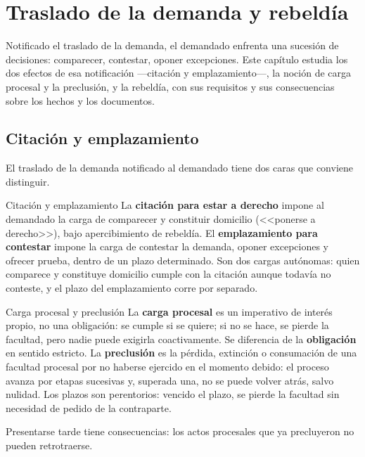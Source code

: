 \documentclass[12pt,oneside]{book}
\begin{document}
\chapter{Traslado de la demanda y rebeldía}\label{cap:traslado}

Notificado el traslado de la demanda, el demandado enfrenta una sucesión de decisiones: comparecer, contestar, oponer excepciones. Este capítulo estudia los dos efectos de esa notificación ---citación y emplazamiento---, la noción de carga procesal y la preclusión, y la rebeldía, con sus requisitos y sus consecuencias sobre los hechos y los documentos.

\section{Citación y emplazamiento}

El traslado de la demanda notificado al demandado tiene dos caras que conviene distinguir.

\begin{definition}{Citación y emplazamiento}
La \textbf{citación para estar a derecho} impone al demandado la carga de comparecer y constituir domicilio (<<ponerse a derecho>>), bajo apercibimiento de rebeldía. El \textbf{emplazamiento para contestar} impone la carga de contestar la demanda, oponer excepciones y ofrecer prueba, dentro de un plazo determinado. Son dos cargas autónomas: quien comparece y constituye domicilio cumple con la citación aunque todavía no conteste, y el plazo del emplazamiento corre por separado.
\end{definition}

\begin{definition}{Carga procesal y preclusión}
La \textbf{carga procesal} es un imperativo de interés propio, no una obligación: se cumple si se quiere; si no se hace, se pierde la facultad, pero nadie puede exigirla coactivamente. Se diferencia de la \textbf{obligación} en sentido estricto. La \textbf{preclusión} es la pérdida, extinción o consumación de una facultad procesal por no haberse ejercido en el momento debido: el proceso avanza por etapas sucesivas y, superada una, no se puede volver atrás, salvo nulidad. Los plazos son perentorios: vencido el plazo, se pierde la facultad sin necesidad de pedido de la contraparte.
\end{definition}

Presentarse tarde tiene consecuencias: los actos procesales que ya precluyeron no pueden retrotraerse.
\end{document}

